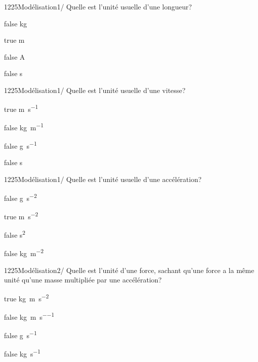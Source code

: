             \begin{question}{1225}{Modélisation}{1}{/}
				Quelle est l'unité usuelle d'une longueur? 
            \end{question}
            \begin{reponses}
            	\item[false] \si{\kilo\gram}
            	\item[true] \si{\meter}
                \item[false] \si{\ampere}
                \item[false] \si{\second}
            \end{reponses}
            \begin{question}{1225}{Modélisation}{1}{/}
				Quelle est l'unité usuelle d'une vitesse? 
            \end{question}
            \begin{reponses}
            	\item[true] \si{\meter\per\second}
            	\item[false] \si{\kilo\gram\per\meter}
                \item[false] \si{\gram\per\second}
                \item[false] \si{\second}
            \end{reponses}
            \begin{question}{1225}{Modélisation}{1}{/}
				Quelle est l'unité usuelle d'une accélération? 
            \end{question}
            \begin{reponses}
                \item[false] \si{\gram\per\second^2}
            	\item[true] \si{\meter\per\second^2}
                \item[false] \si{\second^2}
            	\item[false] \si{\kilo\gram\per\meter^2}
            \end{reponses}
            \begin{question}{1225}{Modélisation}{2}{/}
				Quelle est l'unité d'une force, sachant qu'une force a la même unité qu'une masse multipliée par une accélération?
            \end{question}
            \begin{reponses}
            	\item[true] \si{\kilo\gram.\meter\per\second^2}
            	\item[false] \si{\kilo\gram\per\meter\per\second}
                \item[false] \si{\gram\per\second}
                \item[false] \si{\kilo\gram\per\second}
            \end{reponses}
